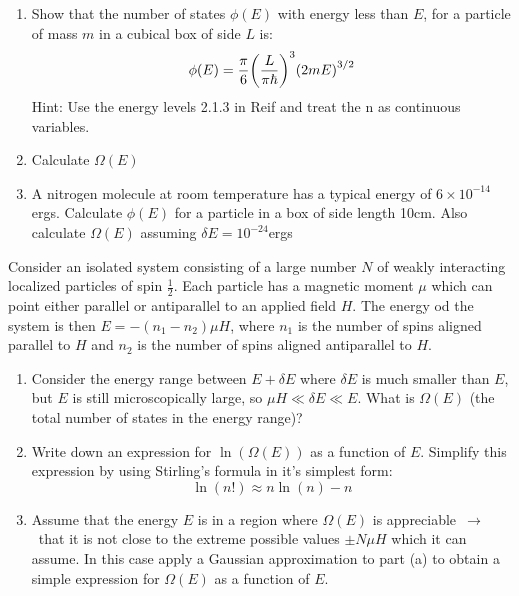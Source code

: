\documentclass{article}
\begin{document}
\begin{problem}
    \begin{enumerate}[label=(\alph*)]
        \item Show that the number of states $\phi(E)$ with energy less than $E$, for a particle of mass $m$ in a cubical box of side $L$ is:
        $$\phi(E)=\frac{\pi}{6}\qty(\frac{L}{\pi\hbar})^3\qty(2mE)^{3/2}$$
        Hint: Use the energy levels 2.1.3 in Reif and treat the n as continuous variables.
        \item Calculate $\Omega(E)$
        \item A nitrogen molecule at room temperature has a typical energy of $6\times10^{-14}$ergs. Calculate $\phi(E)$ for a particle in a box of side length 10cm. Also calculate $\Omega(E)$ assuming $\delta E=10^{-24}$ergs
    \end{enumerate}
    \answerline

\end{problem}\newpage
\begin{problem}[Reif 2.4]
    Consider an isolated system consisting of a large number $N$ of weakly interacting localized particles of spin $\frac{1}{2}$. Each particle has a magnetic moment $\mu$ which can point either parallel or antiparallel to an applied field $H$. The energy od the system is then $E=-(n_1-n_2)\mu H$, where $n_1$ is the number of spins aligned parallel to $H$ and $n_2$ is the number of spins aligned antiparallel to $H$. 
    \begin{enumerate}[label=(\alph*)]
        \item Consider the energy range between $E+\delta E$ where $\delta E$ is much smaller than $E$, but $E$ is still microscopically large, so $\mu H \ll \delta E\ll E$. What is $\Omega(E)$ (the total number of states  in the energy range)?
        \item Write down an expression for $\ln(\Omega(E))$ as a function of $E$. Simplify this expression by using Stirling's formula in it's simplest form: $$\ln(n!)\approx n\ln(n)-n$$
        \item Assume that the energy $E$ is in a region where $\Omega(E)$ is appreciable~$\rightarrow$~that it is not close to the extreme possible values $\pm N\mu H$ which it can assume. In this case apply a Gaussian approximation to part (a) to obtain a simple expression for $\Omega(E)$ as a function of $E$.
    \end{enumerate}
    \answerline
\end{problem}\newpage
\def\dbar{{\mathchar'26\mkern-12mu d}} %
\end{document}
